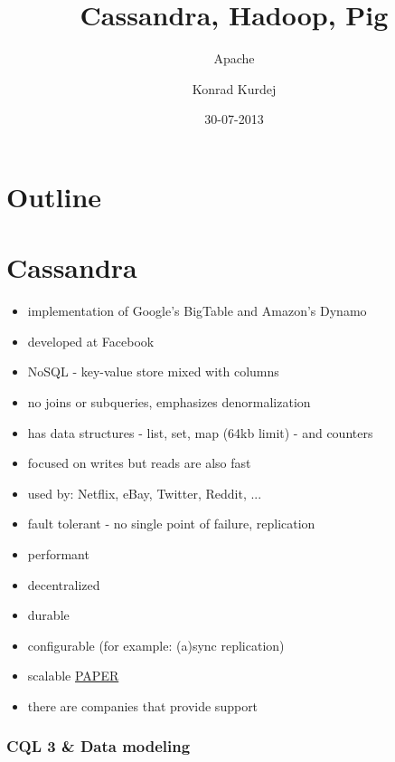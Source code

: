\documentclass{beamer}
\title{Cassandra, Hadoop, Pig}
\subtitle{Apache}
\author{Konrad Kurdej}
\date{30-07-2013}
\begin{document}
\begin{frame}
\titlepage
\end{frame}
\section*{Outline}
\begin{frame}
\tableofcontents
\end{frame}

\section{Cassandra}

\begin{frame}
    \begin{itemize}
        \item implementation of Google's BigTable and Amazon's Dynamo
        \item developed at Facebook
        \item NoSQL - key-value store mixed with columns
        \item no joins or subqueries, emphasizes denormalization
        \item has data structures - list, set, map (64kb limit) - and counters
        \item focused on writes but reads are also fast
    \end{itemize}

\end{frame}


\begin{frame}
\begin{itemize}
 \item used by: Netflix, eBay, Twitter, Reddit, ...
 \item fault tolerant - no single point of failure, replication
 \item performant
 \item decentralized
 \item durable
 \item configurable (for example: (a)sync replication)
 \item scalable \href{http://vldb.org/pvldb/vol5/p1724_tilmannrabl_vldb2012.pdf}{PAPER}
 \item there are companies that provide support
\end{itemize}
\end{frame}


\begin{frame}
    \frametitle{CQL 3 \& Data modeling}
\end{frame}
\end{document}
